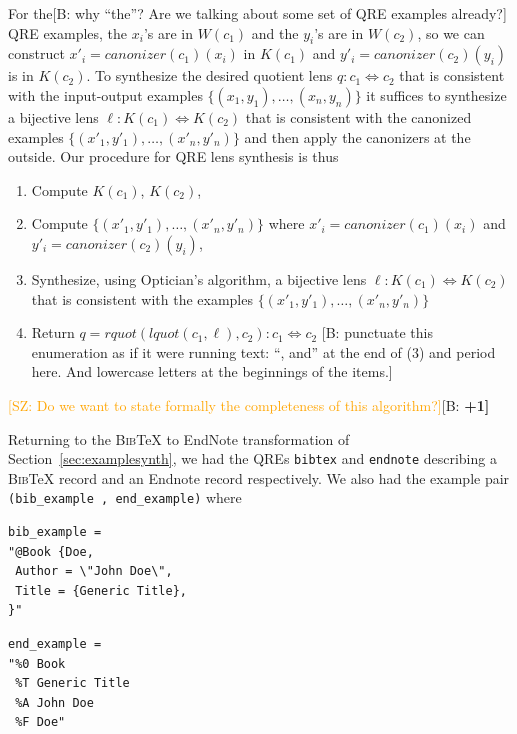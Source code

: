 \documentclass[acmsmall,review,anonymous]{acmart}
\newcommand{\FINISH}[3]{\ifdraft\textcolor{#1}{[#2: #3]}\fi}
\newcommand{\bcp}[1]{\FINISH{dkred}{B}{#1}}
\newcommand{\BCP}[1]{\FINISH{dkred}{B}{\bf #1}}
\newcommand{\saz}[1]{\FINISH{orange}{SZ}{#1}}
\newcommand{\kw}[1]{\ensuremath{\mathit{#1}}}
\newcommand{\canonizer}{\ensuremath{\kw{canonizer}}}
\newcommand{\bibtex}{\textsc{Bib}\TeX{}}
\newcommand{\cd}[1]{\lstinline[backgroundcolor=\color{white}]$#1$}
\begin{document}
For the\bcp{why ``the''?  Are we talking about some set of QRE examples
  already?} QRE examples, the $x_i$'s are in $W(c_1)$ and the $y_i$'s are 
in $W(c_2)$, so we can construct ${x'_i} = \canonizer(c_1)(x_i)$ in $K(c_1)$
and ${y'_i} = \canonizer(c_2)(y_i)$ is in $K(c_2)$. To synthesize the
desired quotient lens $q: c_1 \Leftrightarrow c_2$ that is consistent with the
input-output examples $\{(x_1, y_1), \ldots, (x_n, y_n)\}$ it suffices to
synthesize a bijective lens $\ell : K(c_1) \Leftrightarrow K(c_2)$ that is
consistent with the canonized examples $\{({x'_1}, {y'_1}), \ldots, ({x'_n},
{y'_n})\}$ and then apply the canonizers at the outside. Our procedure for QRE
lens synthesis is thus
\begin{enumerate}
  \item
  Compute $K(c_1)$, $K(c_2)$,
  \item
  Compute $\{({x'_1}, {y'_1}), \ldots, ({x'_n}, {y'_n})\}$ where ${x'_i} =
  \canonizer(c_1)(x_i)$ and ${y'_i} = \canonizer(c_2)(y_i)$,
\item Synthesize, using Optician's algorithm, a bijective lens
  $\ell : K(c_1) \Leftrightarrow K(c_2)$ that is consistent with the examples
  $\{({x'_1}, {y'_1}),\allowbreak \ldots,\allowbreak ({x'_n}, {y'_n})\}$
  \item
  Return $q = \kw{rquot}(\kw{lquot}(c_1, \ell), c_2) : c_1 \Leftrightarrow
  c_2$ \bcp{punctuate this enumeration as if it were running text: ``, and''
  at the end of (3) and period here.  And lowercase letters at the
  beginnings of the items.}
\end{enumerate}

\saz{Do we want to state formally the completeness of this algorithm?}\BCP{+1}

Returning to the \bibtex{} to EndNote transformation of
Section~\ref{sec:examplesynth}, we had the QREs \cd{bibtex} and \cd{endnote}
describing a \bibtex{} record and an Endnote record respectively. We also had
the example pair \cd{(bib_example , end_example)} where

\begin{center}
\begin{minipage}{2.5in}
\begin{lstlisting}
bib_example =
"@Book {Doe,
 Author = \"John Doe\",
 Title = {Generic Title},
}"
\end{lstlisting}
\end{minipage}
\begin{minipage}{1.5in}
\begin{lstlisting}
end_example =
"%0 Book
 %T Generic Title
 %A John Doe
 %F Doe"
\end{lstlisting}
\end{minipage}
\end{center}
\end{document}
